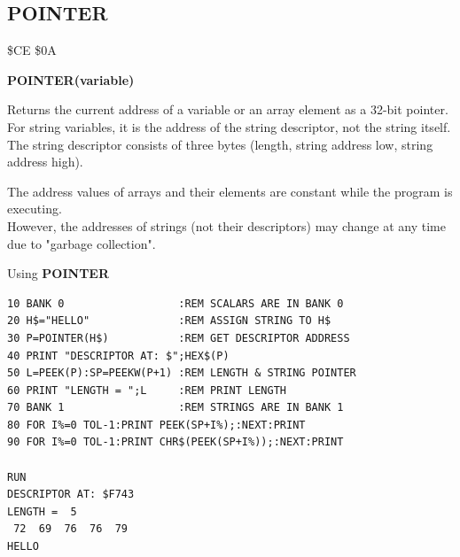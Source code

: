 \subsection{POINTER}
\begin{description}[leftmargin=2cm,style=nextline]
\item [Token:] \$CE \$0A
\item [Format:] {\bf POINTER(variable)}
\item [Usage:]  Returns the current address of a variable
                or an array element as a 32-bit pointer.
                For string variables, it is the address of
                the string descriptor, not the string itself.
                The string descriptor consists of three bytes
                (length, string address low, string address high).

\item [Remarks:] The address values of arrays and their elements
                 are constant while the program is executing. \\
                 However, the addresses of strings (not their descriptors)
                 may change at any time due to
                 "garbage collection".

\item [Example:] Using {\bf POINTER}

\begin{tcolorbox}[colback=black,coltext=white]
\verbatimfont{\codefont}
\begin{verbatim}
10 BANK 0                  :REM SCALARS ARE IN BANK 0
20 H$="HELLO"              :REM ASSIGN STRING TO H$
30 P=POINTER(H$)           :REM GET DESCRIPTOR ADDRESS
40 PRINT "DESCRIPTOR AT: $";HEX$(P)
50 L=PEEK(P):SP=PEEKW(P+1) :REM LENGTH & STRING POINTER
60 PRINT "LENGTH = ";L     :REM PRINT LENGTH
70 BANK 1                  :REM STRINGS ARE IN BANK 1
80 FOR I%=0 TOL-1:PRINT PEEK(SP+I%);:NEXT:PRINT
90 FOR I%=0 TOL-1:PRINT CHR$(PEEK(SP+I%));:NEXT:PRINT

RUN
DESCRIPTOR AT: $F743
LENGTH =  5
 72  69  76  76  79
HELLO
\end{verbatim}
\end{tcolorbox}
\end{description}


\newpage
